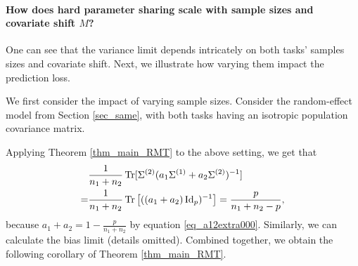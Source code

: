 \paragraph{How does hard parameter sharing scale with sample sizes and covariate shift $M$?}
One can see that the variance limit depends intricately on both tasks' samples sizes and covariate shift.
Next, we illustrate how varying them impact the prediction loss.
\begin{example}\label{ex_sample_ratio}
	We first consider the impact of varying sample sizes.
	Consider the random-effect model from Section \ref{sec_same}, with both tasks having an isotropic population covariance matrix.

	Applying Theorem \ref{thm_main_RMT} to the above setting, we get that
	\begin{align*}
		&\frac{1}{n_1 + n_2} \operatorname{Tr}[\Sigma^{(2)} (a_1\Sigma^{(1)} + a_2\Sigma^{(2)})^{-1}] \\
		=& \frac{1}{n_1 + n_2} \operatorname{Tr}\left[((a_1 + a_2)\operatorname{Id}_p)^{-1}\right]
		= \frac{p}{n_1 + n_2 - p},
	\end{align*}
	because $a_1 + a_2 = 1 - \frac{p}{n_1 + n_2}$ by equation \eqref{eq_a12extra000}.
	Similarly, we can calculate the bias limit (details omitted).
	Combined together, we obtain the following corollary of Theorem \ref{thm_main_RMT}.
\end{example}

